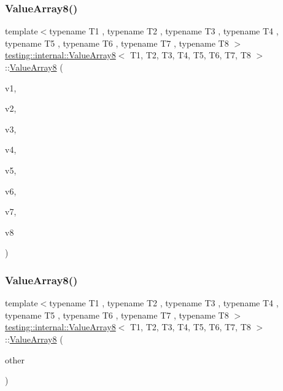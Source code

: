 \subsubsection{\texorpdfstring{ValueArray8()}{ValueArray8()}\hspace{0.1cm}{\footnotesize\ttfamily [1/2]}}
{\footnotesize\ttfamily template$<$typename T1 , typename T2 , typename T3 , typename T4 , typename T5 , typename T6 , typename T7 , typename T8 $>$ \\
\mbox{\hyperlink{classtesting_1_1internal_1_1ValueArray8}{testing\+::internal\+::\+Value\+Array8}}$<$ T1, T2, T3, T4, T5, T6, T7, T8 $>$\+::\mbox{\hyperlink{classtesting_1_1internal_1_1ValueArray8}{Value\+Array8}} (\begin{DoxyParamCaption}\item[{T1}]{v1,  }\item[{T2}]{v2,  }\item[{T3}]{v3,  }\item[{T4}]{v4,  }\item[{T5}]{v5,  }\item[{T6}]{v6,  }\item[{T7}]{v7,  }\item[{T8}]{v8 }\end{DoxyParamCaption})\hspace{0.3cm}{\ttfamily [inline]}}

\mbox{\label{classtesting_1_1internal_1_1ValueArray8_aa2d57c811dc60c02a487c36b4b6b4464}} 
\subsubsection{\texorpdfstring{ValueArray8()}{ValueArray8()}\hspace{0.1cm}{\footnotesize\ttfamily [2/2]}}
{\footnotesize\ttfamily template$<$typename T1 , typename T2 , typename T3 , typename T4 , typename T5 , typename T6 , typename T7 , typename T8 $>$ \\
\mbox{\hyperlink{classtesting_1_1internal_1_1ValueArray8}{testing\+::internal\+::\+Value\+Array8}}$<$ T1, T2, T3, T4, T5, T6, T7, T8 $>$\+::\mbox{\hyperlink{classtesting_1_1internal_1_1ValueArray8}{Value\+Array8}} (\begin{DoxyParamCaption}\item[{const \mbox{\hyperlink{classtesting_1_1internal_1_1ValueArray8}{Value\+Array8}}$<$ T1, T2, T3, T4, T5, T6, T7, T8 $>$ \&}]{other }\end{DoxyParamCaption})\hspace{0.3cm}{\ttfamily [inline]}}



